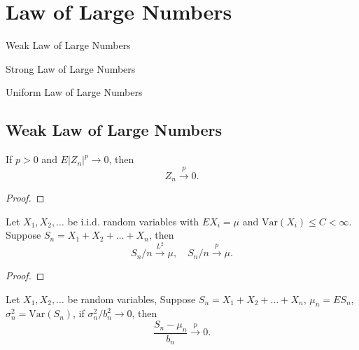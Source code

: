 \chapter{Law of Large Numbers}

\begin{introduction}
    \item Weak Law of Large Numbers
    \item Strong Law of Large Numbers
    \item Uniform Law of Large Numbers
\end{introduction}

\section{Weak Law of Large Numbers}

\begin{lemma}
    If $p>0$ and $E\left|Z_{n}\right|^{p}\rightarrow 0$, then
    \begin{equation}
        Z_{n}\stackrel{p}{\rightarrow}0.
    \end{equation}
\end{lemma}

\begin{proof}

\end{proof}

\begin{theorem}
    Let $X_1,X_2,\ldots$ be i.i.d. random variables with $EX_i=\mu$ and $\text{Var}(X_i)\leq C<\infty$. Suppose $S_n=X_1+X_2+\ldots+X_n$, then
    \begin{equation}
        S_n/n\stackrel{L^2}{\rightarrow}\mu,\quad S_n/n\stackrel{p}{\rightarrow}\mu.
    \end{equation}
\end{theorem}

\begin{proof}

\end{proof}

\begin{theorem}
    Let $X_1,X_2,\ldots$ be random variables, Suppose $S_n=X_1+X_2+\ldots+X_n$, $\mu_n=ES_n$, $\sigma_n^2=\text{Var}(S_n)$, if $\sigma_n^2/b_n^2\rightarrow 0$, then
    \begin{equation}
        \frac{S_n-\mu_n}{b_n}\stackrel{p}{\rightarrow}0.
    \end{equation}
\end{theorem}

